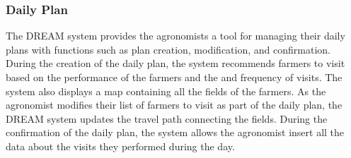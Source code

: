 \begin{flushleft}
\subsubsection{Daily Plan}
The DREAM system provides the agronomists a tool for managing their daily plans with functions such as plan creation, modification, and confirmation. During the creation of the daily plan, the system recommends farmers to visit based on the performance of the farmers and the and frequency of visits. The system also displays a map containing all the fields of the farmers. As the agronomist modifies their list of farmers to visit as part of the daily plan, the DREAM system updates the travel path connecting the fields. During the confirmation of the daily plan, the system allows the agronomist insert all the data about the visits they performed during the day.
\end{flushleft}




